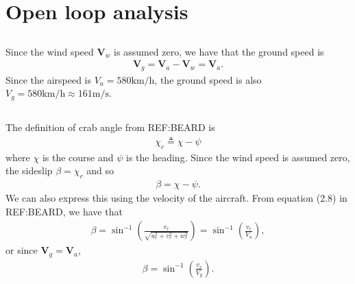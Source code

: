 \section{Open loop analysis}

\subsection{}
Since the wind speed $\mathbf{V}_w$ is assumed zero, we have that the ground speed is
\begin{equation}\begin{aligned}
\label{eq:ground_air}
\mathbf{V}_g = \mathbf{V}_a - \mathbf{V}_w = \mathbf{V}_a.
\end{aligned}\end{equation}
Since the airspeed is $V_a = 580 \si{\kilo \meter / \hour}$, the ground speed is also $V_g = 580 \si{\kilo \meter / \hour} \approx 161 \si{\meter / \second}$.
\subsection{}
The definition of crab angle from REF:BEARD is
\begin{equation}\begin{aligned}
\chi_c \triangleq \chi - \psi
\end{aligned}\end{equation}
where $\chi$ is the course and $\psi$ is the heading. Since the wind speed is assumed zero, the sideslip $\beta = \chi_c$ and so
\begin{equation}\begin{aligned}
\beta = \chi - \psi.
\end{aligned}\end{equation}
We can also express this using the velocity of the aircraft. From equation (2.8) in REF:BEARD, we have that
\begin{equation}\begin{aligned}
\beta = \sin^{-1}\left(\frac{v_r}{\sqrt{u^2_r + v^2_r + w^2_r}}\right) = \sin^{-1}\left(\frac{v_r}{V_a}\right),
\end{aligned}\end{equation}
or since $\mathbf{V}_g = \mathbf{V}_a$,
\begin{equation}\begin{aligned}
\beta = \sin^{-1}\left(\frac{v_r}{V_g}\right).
\end{aligned}\end{equation}


